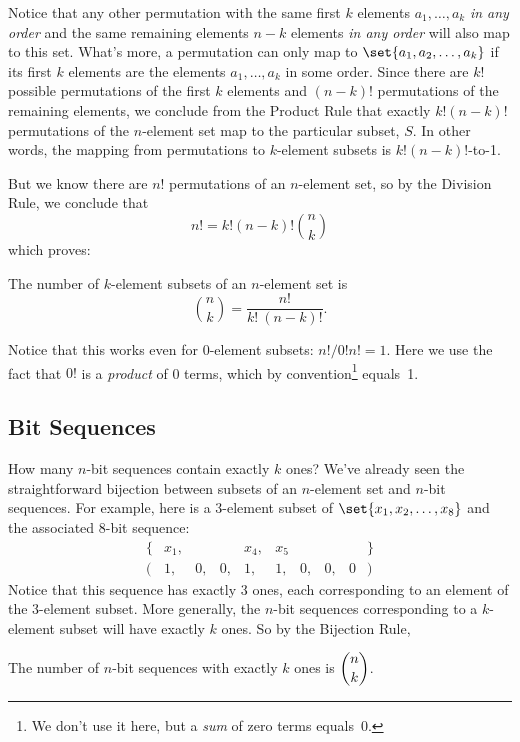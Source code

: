 Notice that any other permutation with the same first $k$ elements
$a_1,\dots,a_k$ \emph{in any order} and the same remaining elements $n-k$
elements \emph{in any order} will also map to this set.  What's more, a
permutation can only map to $\set{a_1,a_2,\dots,a_k}$ if its first $k$
elements are the elements $a_1,\dots,a_k$ in some order.  Since there are
$k!$ possible permutations of the first $k$ elements and $(n-k)!$
permutations of the remaining elements, we conclude from the Product Rule
that exactly $k!(n-k)!$ permutations of the $n$-element set map to the
particular subset, $S$.  In other words, the mapping from permutations to
$k$-element subsets is $k!(n-k)!$-to-1.

But we know there are $n!$ permutations of an $n$-element set, so by the
Division Rule, we conclude that
\[
n!= k!(n-k)!\binom{n}{k}
\]
which proves:
\begin{rul}
\label{rule:subset}
The number of $k$-element subsets of an $n$-element set is
\begin{equation*}
    \binom{n}{k} = \frac{n!}{k!\ (n-k)!}.
\end{equation*}
\end{rul}

Notice that this works even for 0-element subsets: $n!/0!n! = 1$.  Here we
use the fact that $0!$ is a \emph{product} of 0 terms, which by
convention\footnote{We don't use it here, but a \emph{sum} of zero
  terms equals~0.}
equals~1.

\subsection{Bit Sequences}

How many $n$-bit sequences contain exactly $k$ ones?  We've already seen
the straightforward bijection between subsets of an $n$-element set and
$n$-bit sequences.  For example, here is a 3-element subset of $\set{x_1,
x_2, \ldots, x_8}$ and the associated 8-bit sequence:
%
\[
\begin{array}{rccccccccl}
\{ & x_1, &    &    & x_4, & x_5  &    &    &   & \} \\
(  &   1, & 0, & 0, &   1, &   1, & 0, & 0, & 0 & )
\end{array}
\]
Notice that this sequence has exactly 3 ones, each corresponding to an
element of the 3-element subset.  More generally, the $n$-bit sequences
corresponding to a $k$-element subset will have exactly $k$ ones.  So by
the Bijection Rule,
\begin{corollary}
The number of $n$-bit sequences with exactly $k$ ones is $\dbinom{n}{k}$.
\end{corollary}

